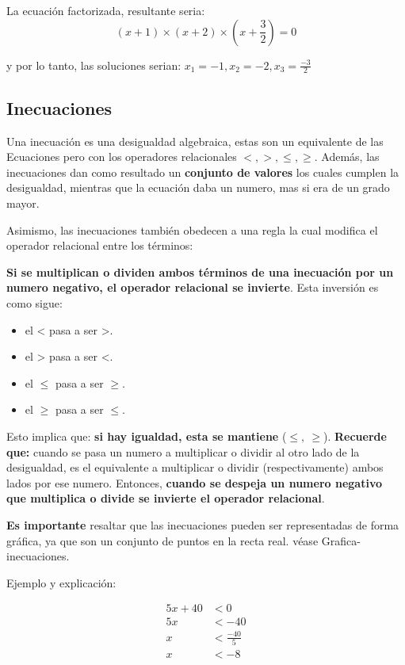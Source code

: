 \documentclass[12pt]{article}
\begin{document}
    La ecuación factorizada, resultante seria:
    $$ (x+1)\times(x+2)\times\left(x+\frac{3}{2}\right)= 0  $$

    y por lo tanto, las soluciones serian: $x_1 = -1, x_2 = -2, x_3=\frac{-3}{2} $

\subsection{Inecuaciones}

    Una inecuación es una desigualdad algebraica, estas son un equivalente de las
    \refname{Ecuaciones} pero con los operadores relacionales $<,>,\leq,\geq$.
    Además, las inecuaciones dan como resultado un \textbf{conjunto de valores}
    los cuales cumplen la desigualdad, mientras que la ecuación daba un numero,
    mas si era de un grado mayor.

    Asimismo, las inecuaciones también obedecen a una regla la cual modifica el
    operador relacional entre los términos:

    \textbf{Si se multiplican o dividen ambos términos de una inecuación por un
    numero negativo, el operador relacional se invierte}. Esta inversión es como
    sigue:

    \begin{itemize}
        \item el < pasa a ser >.
        \item el > pasa a ser <.
        \item el $\leq$ pasa a ser $\geq$.
        \item el $\geq$ pasa a ser $\leq$.
    \end{itemize}

    Esto implica que: \textbf{si hay igualdad, esta se mantiene} ($\leq,\ \geq$).
    \textbf{Recuerde que:} cuando se pasa un numero a multiplicar o dividir al
    otro lado de la desigualdad, es
    el equivalente a multiplicar o dividir (respectivamente) ambos lados por ese
    numero. Entonces, \textbf{cuando se despeja un numero negativo que multiplica
    o divide se invierte el operador relacional}.

    \textbf{Es importante} resaltar que las inecuaciones pueden ser representadas
    de forma gráfica, ya que son un conjunto de puntos en la recta real. véase
    \refname{Grafica-inecuaciones}.


    Ejemplo y explicación:

    \begin{align*}
        5x + 40 & < 0\\
        5x  & < -40\\
        x & < \frac{-40}{5} \\
        x & < -8 \\
    \end{align*}
\end{document}
